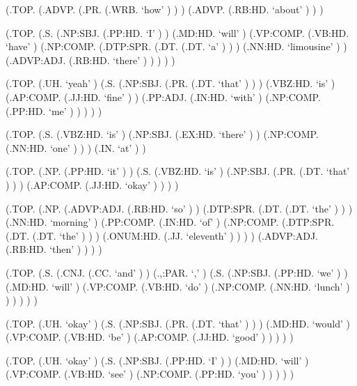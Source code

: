\documentclass[10pt]{article}
\begin{document}
\begin{parsetree}  (.TOP. (.ADVP. (.PR. (.WRB. `how' ) ) ) (.ADVP. (.RB:HD. `about' ) ) ) \end{parsetree}

\begin{parsetree}  (.TOP. (.S. (.NP:SBJ. (.PP:HD. `I' ) ) (.MD:HD. `will' ) (.VP:COMP. (.VB:HD. `have' ) (.NP:COMP. (.DTP:SPR. (.DT. (.DT. `a' ) ) ) (.NN:HD. `limousine' ) ) (.ADVP:ADJ. (.RB:HD. `there' ) ) ) ) ) \end{parsetree}

\begin{parsetree}  (.TOP. (.UH. `yeah' ) (.S. (.NP:SBJ. (.PR. (.DT. `that' ) ) ) (.VBZ:HD. `is' ) (.AP:COMP. (.JJ:HD. `fine' ) ) (.PP:ADJ. (.IN:HD. `with' ) (.NP:COMP. (.PP:HD. `me' ) ) ) ) ) \end{parsetree}

\begin{parsetree}  (.TOP. (.S. (.VBZ:HD. `is' ) (.NP:SBJ. (.EX:HD. `there' ) ) (.NP:COMP. (.NN:HD. `one' ) ) ) (.IN. `at' ) ) \end{parsetree}

\begin{parsetree}  (.TOP. (.NP. (.PP:HD. `it' ) ) (.S. (.VBZ:HD. `is' ) (.NP:SBJ. (.PR. (.DT. `that' ) ) ) (.AP:COMP. (.JJ:HD. `okay' ) ) ) ) \end{parsetree}

\begin{parsetree}  (.TOP. (.NP. (.ADVP:ADJ. (.RB:HD. `so' ) ) (.DTP:SPR. (.DT. (.DT. `the' ) ) ) (.NN:HD. `morning' ) (.PP:COMP. (.IN:HD. `of' ) (.NP:COMP. (.DTP:SPR. (.DT. (.DT. `the' ) ) ) (.ONUM:HD. (.JJ. `eleventh' ) ) ) ) (.ADVP:ADJ. (.RB:HD. `then' ) ) ) ) \end{parsetree}

\begin{parsetree}  (.TOP. (.S. (.CNJ. (.CC. `and' ) ) (.,:PAR. `,' ) (.S. (.NP:SBJ. (.PP:HD. `we' ) ) (.MD:HD. `will' ) (.VP:COMP. (.VB:HD. `do' ) (.NP:COMP. (.NN:HD. `lunch' ) ) ) ) ) ) \end{parsetree}

\begin{parsetree}  (.TOP. (.UH. `okay' ) (.S. (.NP:SBJ. (.PR. (.DT. `that' ) ) ) (.MD:HD. `would' ) (.VP:COMP. (.VB:HD. `be' ) (.AP:COMP. (.JJ:HD. `good' ) ) ) ) ) \end{parsetree}

\begin{parsetree}  (.TOP. (.UH. `okay' ) (.S. (.NP:SBJ. (.PP:HD. `I' ) ) (.MD:HD. `will' ) (.VP:COMP. (.VB:HD. `see' ) (.NP:COMP. (.PP:HD. `you' ) ) ) ) ) \end{parsetree}
\end{document}
